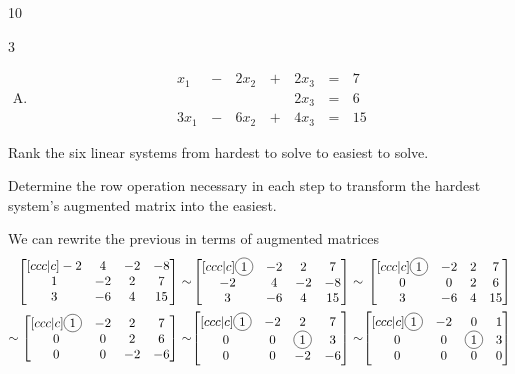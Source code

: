 \begin{applicationActivities}
\begin{activity}{10}
\begin{multicols}{3}
\begin{enumerate}[(A)]
    \item \[
		\begin{alignedat}{4}
   		  x_1 &\,-\,& 2x_2 &\,+\,& 2x_3 &\,=\,& 7 \\
   		   &\,&  && 2x_3 &\,=\,& 6 \\
   		  3x_1 &\,-\, & 6x_2 &\,+\,&  4x_3 &\,=\,&  15
   		\end{alignedat}
	\]
	\end{enumerate}
    \end{multicols}
  \begin{subactivity}
    Rank the six linear systems from hardest to solve to easiest to solve.
  \end{subactivity}
  \begin{subactivity}
	  Determine the row operation necessary in each step to transform the hardest
    system's augmented matrix into the easiest.
  \end{subactivity}
\end{activity}

\begin{observation}
We can rewrite the previous in terms of augmented matrices
\[
	\begin{alignedat}{3}
		\begin{bmatrix}[ccc|c] -2 & 4 & -2 & -8 \\ 1 & -2 & 2 & 7 \\ 3 & -6 & 4 & 15 \end{bmatrix} & \sim &
		\begin{bmatrix}[ccc|c] \circledNumber{1} & -2 & 2 & 7 \\ -2 & 4 & -2 & -8 \\ 3 & -6 & 4 & 15 \end{bmatrix} &\sim&
		\begin{bmatrix}[ccc|c] \circledNumber{1} & -2 & 2 & 7 \\ 0 & 0 & 2 & 6 \\ 3 & - 6 & 4 & 15 \end{bmatrix} \\
 \sim
		\begin{bmatrix}[ccc|c] \circledNumber{1} & -2 & 2 & 7 \\ 0 & 0 & 2 & 6 \\ 0 & 0 & -2 & -6 \end{bmatrix}  &\sim&
		\begin{bmatrix}[ccc|c] \circledNumber{1} & -2 & 2 & 7 \\ 0 & 0 & \circledNumber{1} & 3 \\ 0 & 0 & -2 & -6 \end{bmatrix}  &\sim&
		\begin{bmatrix}[ccc|c] \circledNumber{1} & -2 & 0 & 1 \\ 0 & 0 & \circledNumber{1} & 3 \\ 0 & 0 & 0 & 0 \end{bmatrix}
 	\end{alignedat}
\]


\end{observation}
\end{applicationActivities}
